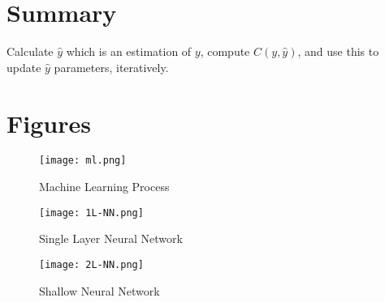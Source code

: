 \section{Summary}
Calculate $\hat{y}$ which is an estimation of $y$, compute $C(y,\hat{y})$, and use this to update $\hat{y}$ parameters, iteratively.

\section{Figures}\label{section:figs}
\begin{figure}[h]
 \centering
 \texttt{[image: ml.png]}
  \caption{Machine Learning Process}\label{fig:learn}
\end{figure}

\begin{figure}
 \centering
 \texttt{[image: 1L-NN.png]}
 \caption{Single Layer Neural Network}
 \label{fig:single}
\end{figure}

\begin{figure}
 \centering
 \texttt{[image: 2L-NN.png]}
 \caption{Shallow Neural Network}
 \label{fig:shallow}
\end{figure}
